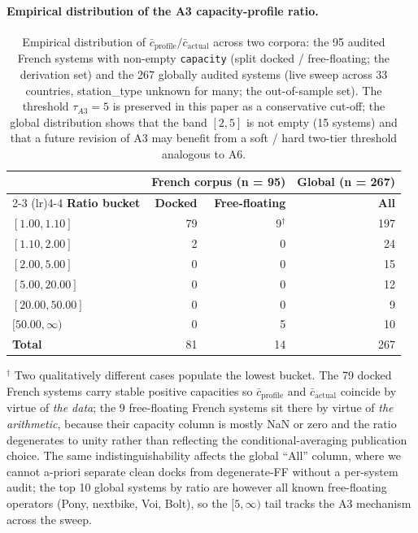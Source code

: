 \documentclass[11pt,a4paper]{article}
\begin{document}
\paragraph{Empirical distribution of the A3 capacity-profile ratio.}

\begin{table}[!htbp]
\centering
\caption{Empirical distribution of
$\bar c_{\text{profile}}/\bar c_{\text{actual}}$ across two
corpora: the 95 audited French systems with non-empty
\texttt{capacity} (split docked / free-floating; the derivation
set) and the 267 globally audited systems (live sweep across 33
countries, station\_type unknown for many; the out-of-sample
set). The threshold $\tau_{A3} = 5$ is preserved in this paper
as a conservative cut-off; the global distribution shows that
the band $[2, 5]$ is not empty (15 systems) and that a future
revision of A3 may benefit from a soft / hard two-tier
threshold analogous to A6.}
\label{tab:a3-threshold-empirical}
\small
\begin{tabular}{@{}lrrr@{}}
\toprule
& \multicolumn{2}{c}{\textbf{French corpus (n = 95)}} & \textbf{Global (n = 267)}\\
\cmidrule(lr){2-3} \cmidrule(lr){4-4}
\textbf{Ratio bucket} & \textbf{Docked} & \textbf{Free-floating} & \textbf{All}\\
\midrule
$[1.00, 1.10]$    & 79 & 9$^\dag$ & 197 \\
$[1.10, 2.00]$    & 2  & 0        & 24 \\
$[2.00, 5.00]$    & 0  & 0        & 15 \\
$[5.00, 20.00]$   & 0  & 0        & 12 \\
$[20.00, 50.00]$  & 0  & 0        & 9 \\
$[50.00, \infty)$ & 0  & 5        & 10 \\
\midrule
\textbf{Total}    & 81 & 14       & 267 \\
\bottomrule
\end{tabular}

\medskip
{\footnotesize $^\dag$ Two qualitatively different cases populate
the lowest bucket. The 79 docked French systems carry stable
positive capacities so $\bar c_{\text{profile}}$ and
$\bar c_{\text{actual}}$ coincide by virtue of \emph{the data};
the 9 free-floating French systems sit there by virtue of
\emph{the arithmetic}, because their capacity column is mostly
NaN or zero and the ratio degenerates to unity rather than
reflecting the conditional-averaging publication choice. The
same indistinguishability affects the global ``All'' column,
where we cannot a-priori separate clean docks from degenerate-FF
without a per-system audit; the top 10 global systems by ratio
are however all known free-floating operators (Pony, nextbike,
Voi, Bolt), so the $[5, \infty)$ tail tracks the A3 mechanism
across the sweep.}
\end{table}
\end{document}
